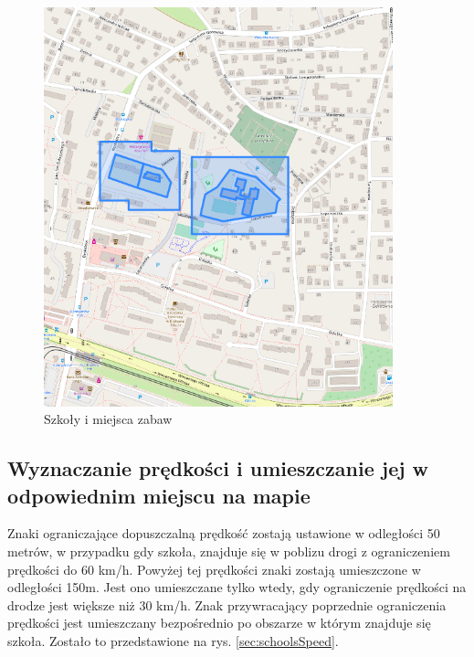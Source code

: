 \begin{figure}[h]
\caption{Szkoły i miejsca zabaw}
\label{sec:schoolBorder}
\centering
\includegraphics[width=0.9\textwidth]{schoolsBorder}
\end{figure}

\newpage
\subsection{Wyznaczanie prędkości i umieszczanie jej w odpowiednim miejscu na mapie}

Znaki ograniczające dopuszczalną prędkość zostają ustawione w odległości 50 metrów, w przypadku gdy szkoła, znajduje się w poblizu drogi z ograniczeniem prędkości do 60 km/h. Powyżej tej prędkości znaki zostają umieszczone w odległości 150m. Jest ono umieszczane tylko wtedy, gdy ograniczenie prędkości na drodze jest większe niż 30 km/h. Znak przywracający poprzednie ograniczenia prędkości jest umieszczany bezpośrednio po obszarze w którym znajduje się szkoła. Zostało to przedstawione na rys. \ref{sec:schoolsSpeed}.

